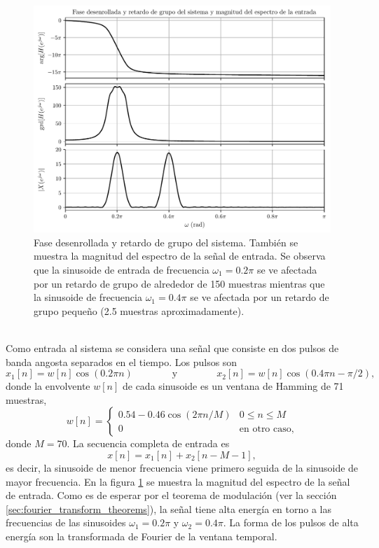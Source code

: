 \documentclass[a4paper]{report}
\begin{document}
\begin{figure}[!htb]
 \begin{center}
 \includegraphics[width=\textwidth]{figuras/transform_analysis_example_5_1_2_group_delay.pdf}
 \caption{\label{fig:transform_analysis_example_5_1_2_group_delay} Fase desenrollada y retardo de grupo del sistema. También se muestra la magnitud del espectro de la señal de entrada. Se observa que la sinusoide de entrada de frecuencia \(\omega_1=0.2\pi\) se ve afectada por un retardo de grupo de alrededor de 150 muestras mientras que la sinusoide de frecuencia \(\omega_1=0.4\pi\) se ve afectada por un retardo de grupo pequeño (2.5 muestras aproximadamente).}
 \end{center}
\end{figure} 
\\
Como entrada al sistema se considera una señal que consiste en dos pulsos de banda angosta separados en el tiempo. Los pulsos son
\[
 x_1[n]=w[n]\cos(0.2\pi n)
 \qquad\qquad\textrm{y}\qquad\qquad
 x_2[n]=w[n]\cos(0.4\pi n-\pi/2),
\]
donde la envolvente \(w[n]\) de cada sinusoide es un ventana de Hamming de 71 muestras,
\[
 w[n]=\left\{ 
 \begin{array}{ll}
  0.54-0.46\cos(2\pi n/M) & 0\leq n\leq M\\
  0 &\textrm{en otro caso},
 \end{array}
 \right.
\]
donde \(M=70\). La secuencia completa de entrada es
\[
 x[n]=x_1[n]+x_2[n-M-1],
\]
es decir, la sinusoide de menor frecuencia viene primero seguida de la sinusoide de mayor frecuencia. En la figura \ref{fig:transform_analysis_example_5_1_2_group_delay} se muestra la magnitud del espectro de la señal de entrada. Como es de esperar por el teorema de modulación (ver la sección \ref{sec:fourier_transform_theorems}), la señal tiene alta energía en torno a las frecuencias de las sinusoides \(\omega_1=0.2\pi\) y \(\omega_2=0.4\pi\). La forma de los pulsos de alta energía son la transformada de Fourier de la ventana temporal.
\end{document}
